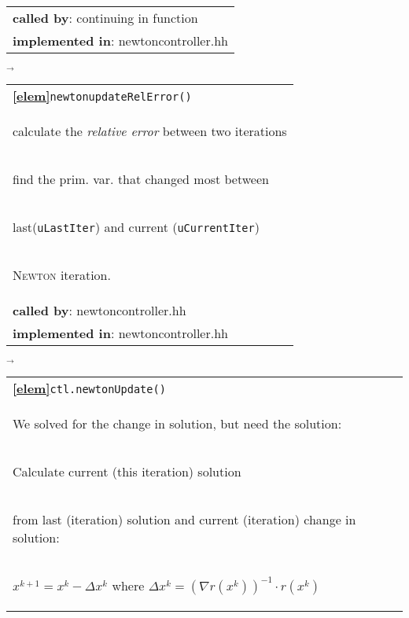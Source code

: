 \begin{landscape}
{\begin{tabular}{|l|}
      \textbf{called by}: continuing in function\\ 
      \textbf{implemented in}: newtoncontroller.hh\\ 
	\hline 
  \end{tabular}
\nextline
    {\scriptsize$\overrightarrow{}
    $}
   \begin{tabular}{|l|} 
      \hline 
      \textbf{\textcircled{\ref{elem}}}\verb+newtonupdateRelError()+\\ 
      \begin{scriptsize}calculate the \emph{relative error} between two iterations\end{scriptsize}\\
      \begin{scriptsize}\quad find the prim. var. that changed most between \end{scriptsize}\\
      \begin{scriptsize}\quad last(\verb+uLastIter+) and current (\verb+uCurrentIter+) \end{scriptsize}\\
      \begin{scriptsize}\quad \textsc{Newton} iteration.\end{scriptsize}\\
      \textbf{called by}: newtoncontroller.hh\\ 
      \textbf{implemented in}: newtoncontroller.hh\\ 
	\hline 
  \end{tabular}
    {\scriptsize$\overrightarrow{}
    $}
   \begin{tabular}{|l|} 
      \hline 
      \textbf{\textcircled{\ref{elem}}}\verb+ctl.newtonUpdate()+\\ 
      \begin{scriptsize}We solved for  the change in solution, but need the solution:\end{scriptsize}\\
      \begin{scriptsize}Calculate current (this iteration) solution\end{scriptsize}\\
      \begin{scriptsize}\quad from last (iteration) solution and current (iteration) change in  solution:\end{scriptsize}\\
      \begin{scriptsize} $x^{k+1} = x^k - \Delta x^k$ where $\Delta x^k = (\nabla r(x^k))^{-1} \cdot r(x^k)$\end{scriptsize}\\ 

\end{tabular}}
\end{landscape}
